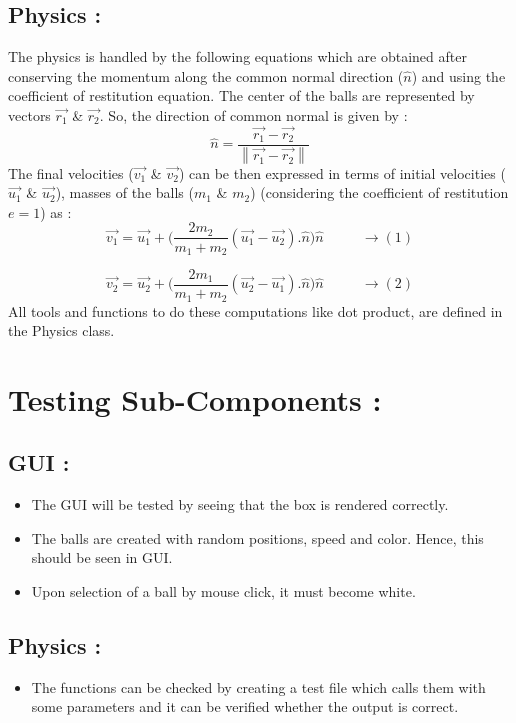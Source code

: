 \documentclass[]{article}
\begin{document}
\subsection{Physics :}
\Large The physics is handled by the following equations which are obtained after conserving the momentum along the common normal direction ($\hat{n}$) and using the coefficient of restitution equation. 
\newline
The center of the balls are represented by vectors $\vec{r_{1}}$ \& $\vec{r_{2}}$.
\newline
So, the direction of common normal is given by :
\[\hat{n} = \frac{\vec{r_{1}}-\vec{r_{2}}}{\left \| \vec{r_{1}}-\vec{r_{2}} \right \|}\]
The final velocities ($\vec{v_{1}}$ \& $\vec{v_{2}}$) can be then expressed in terms of initial velocities ($\vec{u_{1}}$ \& $\vec{u_{2}}$), masses of the balls ($m_{1} $ \&  $m_{2}$) (considering the coefficient of restitution $e = 1$) as :
\[\vec{v_{1}} = \vec{u_{1}}+\Bigg(\frac{2m_{2}}{m_{1}+m_{2}}(\vec{u_{1}}-\vec{u_{2}}).\hat{n}\Bigg)\hat{n} \ \ \ \ \ \ \ \ \ \ \ \ \rightarrow (1)\]

\[\vec{v_{2}} = \vec{u_{2}}+\Bigg(\frac{2m_{1}}{m_{1}+m_{2}}(\vec{u_{2}}-\vec{u_{1}}).\hat{n}\Bigg)\hat{n} \ \ \ \ \ \ \ \ \ \ \ \ \rightarrow (2)\]
All tools and functions to do these computations like dot product, are defined in the Physics class. 

\section{\LARGE Testing Sub-Components :}
\subsection{GUI :}
\Large 
\begin{itemize}
	\item The GUI will be tested by seeing that the box is rendered correctly.
	\item The balls are created with random positions, speed and color. Hence, this should be seen in GUI.
	\item Upon selection of a ball by mouse click, it must become white.
\end{itemize}
\subsection{Physics :}
\Large\begin{itemize}
	\item The functions can be checked by creating a test file which calls them with some parameters and it can be verified whether the output is correct.
\end{itemize}
\end{document}
